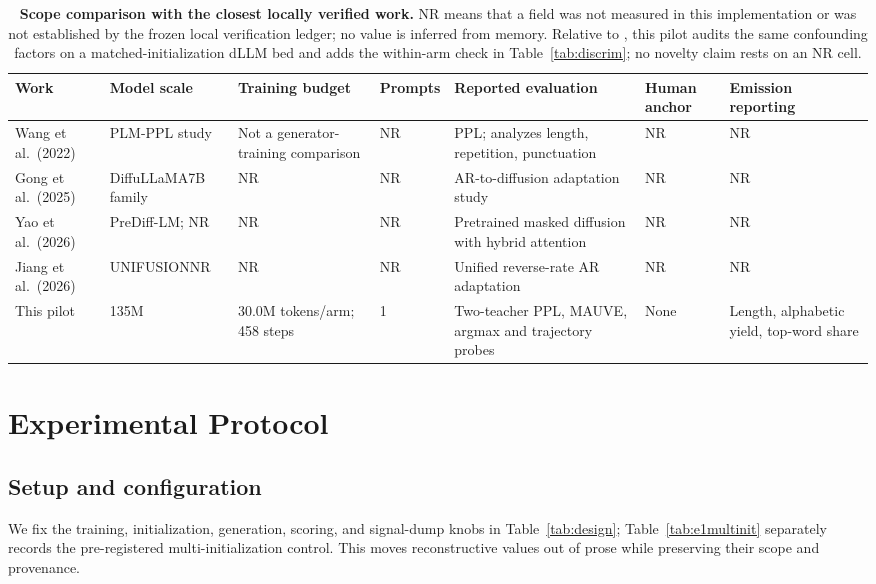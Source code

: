 \documentclass{article}
\begin{document}
\begin{table}[!t]
  \caption{\textbf{Scope comparison with the closest locally verified work.}
  NR means that a field was not measured in this implementation or was not
  established by the frozen local verification ledger; no value is inferred
  from memory.  Relative to \citet{wang2022ppl}, this pilot audits the same
  confounding factors on a matched-initialization dLLM bed and adds the
  within-arm check in Table~\ref{tab:discrim}; no novelty claim rests on an NR cell.}
  \label{tab:literature}
  \centering
  \footnotesize
  \setlength{\tabcolsep}{2.5pt}
  \begin{tabular}{@{}L{0.13\textwidth}L{0.13\textwidth}L{0.14\textwidth}L{0.09\textwidth}L{0.19\textwidth}L{0.10\textwidth}L{0.14\textwidth}@{}}
    \toprule
    Work & Model scale & Training budget & Prompts & Reported evaluation & Human anchor & Emission reporting \\
    \midrule
    Wang et al.\ (2022) & PLM-PPL study & Not a generator-training comparison & NR & PPL; analyzes length, repetition, punctuation & NR & NR \\
    Gong et al.\ (2025) & DiffuLLaMA\newline 7B family & NR & NR & AR-to-diffusion adaptation study & NR & NR \\
    Yao et al.\ (2026) & PreDiff-LM; NR & NR & NR & Pretrained masked diffusion with hybrid attention & NR & NR \\
    Jiang et al.\ (2026) & UNIFUSION\newline NR & NR & NR & Unified reverse-rate AR adaptation & NR & NR \\
    This pilot & 135M & 30.0M tokens/arm; 458 steps & 1 & Two-teacher PPL, MAUVE, argmax and trajectory probes & None & Length, alphabetic yield, top-word share \\
    \bottomrule
  \end{tabular}
\end{table}

\section{Experimental Protocol}
\label{sec:method}

\subsection{Setup and configuration}
\label{sec:setup}

We fix the training, initialization, generation, scoring, and signal-dump
knobs in Table~\ref{tab:design}; Table~\ref{tab:e1multinit} separately records
the pre-registered multi-initialization control.  This moves reconstructive
values out of prose while preserving their scope and provenance.
\end{document}
